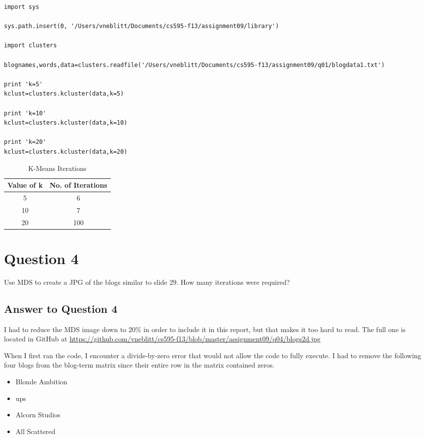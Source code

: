 \documentclass{article}
\begin{document}
\begin{lstlisting}[frame=single, caption=getKMeans.py, label=getKMeans]
import sys

sys.path.insert(0, '/Users/vneblitt/Documents/cs595-f13/assignment09/library')

import clusters

blognames,words,data=clusters.readfile('/Users/vneblitt/Documents/cs595-f13/assignment09/q01/blogdata1.txt')

print 'k=5'
kclust=clusters.kcluster(data,k=5)

print 'k=10'
kclust=clusters.kcluster(data,k=10)

print 'k=20'
kclust=clusters.kcluster(data,k=20)
\end{lstlisting}

\begin{table}[!h]
\centering
\begin{tabular}{c c}
Value of k & No. of Iterations \\
\hline
5 & 6  \\
10 & 7  \\
20 & 100  \\
\hline
\end{tabular}
\caption{K-Means Iterations}
\end{table}

\newpage
\section*{Question 4}
Use MDS to create a JPG of the blogs similar to slide 29. How many iterations were required?

\subsection*{Answer to Question 4}

I had to reduce the MDS image down to 20\% in order to include it in this report, but that makes it too hard to read. The full one is located in GitHub at \url{https://github.com/vneblitt/cs595-f13/blob/master/assignment09/q04/blogs2d.jpg}

When I first ran the code, I encounter a divide-by-zero error that would not allow the code to fully execute. I had to remove the following four blogs from the blog-term matrix since their entire row in the matrix contained zeros.

\begin{itemize}
\item Blonde Ambition
\item ups
\item Alcorn Studios
\item All Scattered
\end{itemize}
\end{document}
